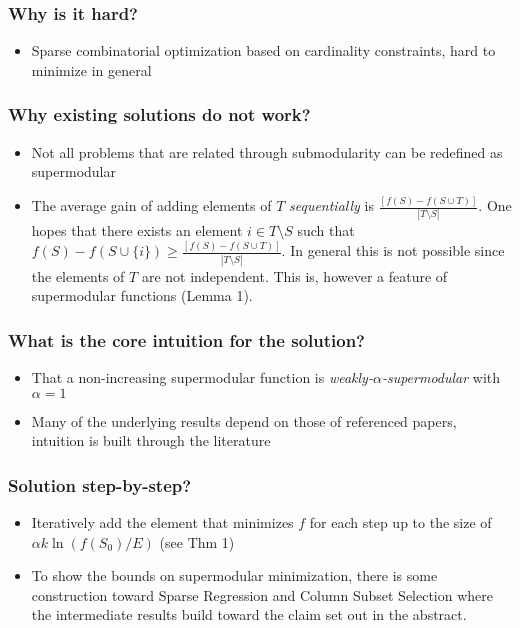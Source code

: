 \documentclass{article}
\begin{document}
\subsubsection*{Why is it hard?}
\begin{itemize}
\item Sparse combinatorial optimization based on cardinality constraints, hard to minimize in general
\end{itemize}

\subsubsection*{Why existing solutions do not work?}
\begin{itemize}
\item Not all problems that are related through submodularity can be redefined as supermodular
\item The average gain of adding elements of $T$ {\it sequentially} is $\frac{[f(S) - f(S\cup T)]}{|T\setminus S|}$. One hopes that there exists an element $i\in T\setminus S$ such that $f(S)-f(S\cup\{i\}) \geq \frac{[f(S) - f(S\cup T)]}{|T\setminus S|}$. In general this is not possible since the elements of $T$ are not independent. This is, however a feature of supermodular functions (Lemma 1).
\end{itemize}

\subsubsection*{What is the core intuition for the solution?}
\begin{itemize}
\item That a non-increasing supermodular function is {\it weakly-$\alpha$-supermodular} with $\alpha=1$
\item Many of the underlying results depend on those of referenced papers, intuition is built through the literature
\end{itemize}

\subsubsection*{Solution step-by-step?}
\begin{itemize}
\item Iteratively add the element that minimizes $f$ for each step up to the size of $\alpha k \ln (f(S_0)/E)$ (see Thm 1)
\item To show the bounds on supermodular minimization, there is some construction toward Sparse Regression and Column Subset Selection where the intermediate results build toward the claim set out in the abstract.
\end{itemize}
\end{document}
